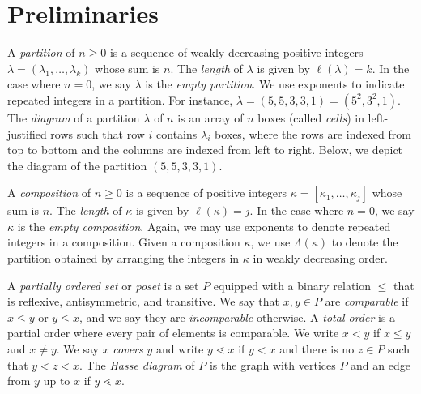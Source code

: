 \documentclass[12pt]{amsart}
\numberwithin{equation}{section}
\theoremstyle{plain}
\theoremstyle{definition}
\theoremstyle{remark}
\begin{document}
\section{Preliminaries}
\label{sect:prelims}
 A \textit{partition} of $n\ge 0$ is a sequence of weakly decreasing positive integers $\lambda=(\lambda_1,\dots,\lambda_k)$ whose sum is $n$.
 The \textit{length} of $\lambda$ is given by $\ell(\lambda)=k$. In the case where $n=0$, we say $\lambda$ is the \textit{empty partition}. We use exponents to indicate repeated integers in a partition. For instance, $\lambda=(5,5,3,3,1)=(5^2,3^2,1)$. The \textit{diagram} of a partition $\lambda$ of $n$ is an array of $n$ boxes (called \textit{cells}) in left-justified rows such that row $i$ contains $\lambda_i$ boxes, where the rows are indexed from top to bottom and the columns are indexed from left to right. Below, we depict the diagram of the partition $(5,5,3,3,1)$.


 \begin{figure}[H]
\label{fig:young_diagram_example}
 \end{figure}

 A \textit{composition} of $n\ge 0$ is a sequence of positive integers $\kappa=[\kappa_1,\dots,\kappa_j]$ whose sum is $n$. The \textit{length} of $\kappa$ is given by $\ell(\kappa)=j$. In the case where $n=0$, we say $\kappa$ is the \textit{empty composition}.
 Again, we may use exponents to denote repeated integers in a composition. Given a composition $\kappa$, we use $\Lambda(\kappa)$ to denote the partition obtained by arranging the integers in $\kappa$ in weakly decreasing order. 


A \textit{partially ordered set} or \textit{poset} is a set $P$ equipped with a binary relation $\le$ that is reflexive, antisymmetric, and transitive. We say that $x,y\in P$ are \textit{comparable} if $x\le y$ or $y\le x$, and we say they are \textit{incomparable} otherwise. A \textit{total order} is a partial order where every pair of elements is comparable. We write $x<y$ if $x\le y$ and $x\ne y$. We say $x$ \textit{covers} $y$ and write $y\lessdot x$ if $y<x$ and there is no $z\in P$ such that $y<z<x$. The \textit{Hasse diagram} of $P$ is the graph with vertices $P$ and an edge from $y$ up to $x$ if $y\lessdot x$. 
\end{document}
